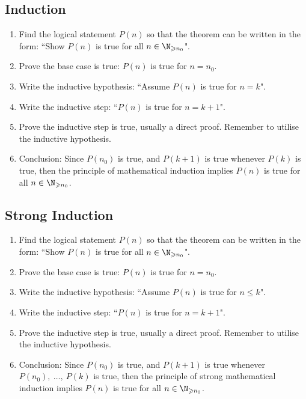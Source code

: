 \documentclass{article}
\begin{document}
\subsection{Induction}
\begin{enumerate}
    \item Find the logical statement $P(n)$ so that the theorem can be written in the form: ``Show $P(n)$ is true for all $n \in \N_{\geqslant n_0}$".
    \item Prove the base case is true: $P(n)$ is true for $n=n_0$.
    \item Write the inductive hypothesis: ``Assume $P(n)$ is true for $n=k$".
    \item Write the inductive step: ``$P(n)$ is true for $n=k+1$".
    \item Prove the inductive step is true, usually a direct proof. Remember to utilise the inductive hypothesis.
    \item Conclusion: Since $P(n_0)$ is true, and $P(k+1)$ is true whenever $P(k)$ is true, then the principle of mathematical induction implies $P(n)$ is true for all $n\in \N_{\geqslant n_0}$.
\end{enumerate}
%
\subsection{Strong Induction}
\begin{enumerate}
    \item Find the logical statement $P(n)$ so that the theorem can be written in the form: ``Show $P(n)$ is true for all $n \in \N_{\geqslant n_0}$".
    \item Prove the base case is true: $P(n)$ is true for $n=n_0$.
    \item Write the inductive hypothesis: ``Assume $P(n)$ is true for $n\leqslant k$".
    \item Write the inductive step: ``$P(n)$ is true for $n=k+1$".
    \item Prove the inductive step is true, usually a direct proof. Remember to utilise the inductive hypothesis.
    \item Conclusion: Since $P(n_0)$ is true, and $P(k+1)$ is true whenever $P(n_0),\: \ldots,\: P(k)$ is true, then the principle of strong mathematical induction implies $P(n)$ is true for all $n\in \N_{\geqslant n_0}$.
\end{enumerate}
%
\pagebreak
\end{document}
